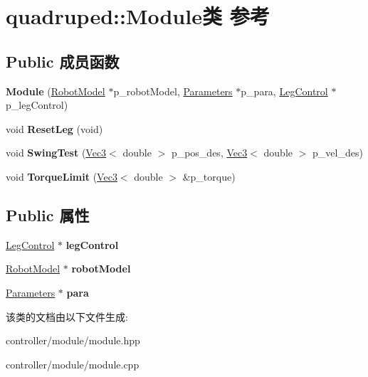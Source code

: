 \hypertarget{classquadruped_1_1Module}{}\section{quadruped\+:\+:Module类 参考}
\label{classquadruped_1_1Module}
\subsection*{Public 成员函数}
\begin{DoxyCompactItemize}
\item 
\mbox{\label{classquadruped_1_1Module_a35b9160967ca7f10f66054d09f6fad02}} 
{\bfseries Module} (\hyperlink{classquadruped_1_1RobotModel}{Robot\+Model} $\ast$p\+\_\+robot\+Model, \hyperlink{classquadruped_1_1Parameters}{Parameters} $\ast$p\+\_\+para, \hyperlink{classquadruped_1_1LegControl}{Leg\+Control} $\ast$p\+\_\+leg\+Control)
\item 
\mbox{\label{classquadruped_1_1Module_a3bc90b0998251e6abaaefee7a08c11de}} 
void {\bfseries Reset\+Leg} (void)
\item 
\mbox{\label{classquadruped_1_1Module_acb56e73f76d0dc28443baad534e70853}} 
void {\bfseries Swing\+Test} (\hyperlink{cppTypes_8h_a65c27bf97693676535dd0b30ea0ad399}{Vec3}$<$ double $>$ p\+\_\+pos\+\_\+des, \hyperlink{cppTypes_8h_a65c27bf97693676535dd0b30ea0ad399}{Vec3}$<$ double $>$ p\+\_\+vel\+\_\+des)
\item 
\mbox{\label{classquadruped_1_1Module_a3e1100bd58a23d0a921d94bad2737242}} 
void {\bfseries Torque\+Limit} (\hyperlink{cppTypes_8h_a65c27bf97693676535dd0b30ea0ad399}{Vec3}$<$ double $>$ \&p\+\_\+torque)
\end{DoxyCompactItemize}
\subsection*{Public 属性}
\begin{DoxyCompactItemize}
\item 
\mbox{\label{classquadruped_1_1Module_ad305afcca90df7b15669fe23d133d6ec}} 
\hyperlink{classquadruped_1_1LegControl}{Leg\+Control} $\ast$ {\bfseries leg\+Control}
\item 
\mbox{\label{classquadruped_1_1Module_a170dbfbd831d2447eeefa7cce88fd9dc}} 
\hyperlink{classquadruped_1_1RobotModel}{Robot\+Model} $\ast$ {\bfseries robot\+Model}
\item 
\mbox{\label{classquadruped_1_1Module_ad4cbc63075ea99e920feab5c1c2d103d}} 
\hyperlink{classquadruped_1_1Parameters}{Parameters} $\ast$ {\bfseries para}
\end{DoxyCompactItemize}


该类的文档由以下文件生成\+:\begin{DoxyCompactItemize}
\item 
controller/module/module.\+hpp\item 
controller/module/module.\+cpp\end{DoxyCompactItemize}
